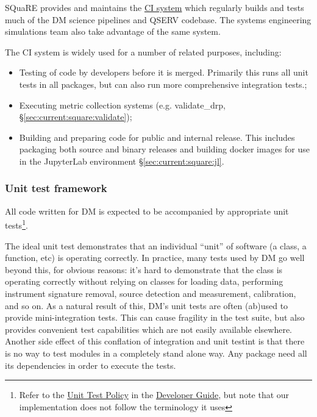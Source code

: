 \documentclass[DM,authoryear,toc,lsstdraft]{lsstdoc}
\begin{document}
SQuaRE provides and maintains the \href{https://ci.lsst.codes}{CI system} which regularly builds and
tests much of the DM science pipelines and QSERV codebase.  The systems engineering simulations
team also take advantage of the same system.

The CI system is widely used for a number of related purposes, including:

\begin{itemize}

  \item{Testing of code by developers before it is merged.  Primarily this runs all unit tests in all
  packages, but can also run more comprehensive integration tests.;}
  \item{Executing metric collection systems (e.g. validate\_drp,
  \S\ref{sec:current:square:validate});}
  \item{Building and preparing code for public and internal release. This includes
  packaging both source and binary releases and building docker images for use in the
  JupyterLab environment \S\ref{sec:current:square:jl}.}

\end{itemize}

\subsubsection{Unit test framework}
\label{sec:current:square:unit}

All code written for DM is expected to be accompanied by appropriate unit
tests\footnote{Refer to the
\href{https://developer.lsst.io/coding/unit_test_policy.html}{Unit Test
Policy} in the \href{https://developer.lsst.io}{Developer Guide}, but note
that our implementation does not follow the terminology it uses}.

The ideal unit test demonstrates that an individual ``unit'' of software (a
class, a function, etc) is operating correctly. In practice, many tests used
by DM go well beyond this, for obvious reasons: it's hard to demonstrate that
the  class is operating correctly without relying on
classes for loading data, performing instrument signature removal, source
detection and measurement, calibration, and so on. As a natural result of
this, DM's unit tests are often (ab)used to provide mini-integration tests.
This can cause fragility in the test suite, but also provides convenient
test capabilities which are not easily available elsewhere. Another side
effect of this conflation of integration and unit testint is that there
is no way to test modules in a completely stand alone way. Any package
need all its dependencies in order to execute the tests.
\end{document}
